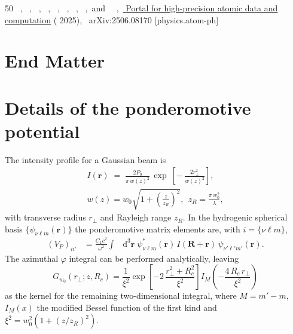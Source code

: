 \documentclass[aps,prl,groupedaddress,superscriptaddress,twocolumn,10pt,longbibliography]{revtex4-2}
\begin{document}
\begin{thebibliography}{50}
  \BibitemOpen
   { {~},  {~},  {~},  {~},  {~},  {~},  {~},  {~},\ and\  {\ },\ }\href {https://arxiv.org/abs/2506.08170} { {Portal for high-precision atomic data and computation}} ( {2025}),\  {arXiv:2506.08170 [physics.atom-ph]} 
\end{thebibliography}










\clearpage
\appendix
\makeatletter
\section{End Matter}
\section{Details of the ponderomotive potential}
\label{app:appendA}
The intensity profile for a Gaussian beam is
\begin{align}
I(\boldsymbol{r}) \;=\; \frac{2P_0}{\pi\,w(z)^2}\,
\exp\ \left[-\,\frac{2r_{\perp}^2}{w(z)^2}\right],
\label{eq:gaussian} \\
w(z)=w_0\sqrt{1+\left(\frac{z}{z_R}\right)^2}, \ \
z_R=\frac{\pi\,w_0^2}{\lambda}, \nonumber
\end{align}
with transverse radius $r_{\perp}$ and Rayleigh range $z_R$. In the hydrogenic spherical basis $\{\psi_{\nu\ell m}(\boldsymbol{r})\}$ the ponderomotive matrix elements are, with $i=\{\nu \ell m\}$,
\begin{align}
(V_P)_{ii'} & =
\frac{C_1 c^2}{\omega^2}
\int & \mathrm{d}^3\boldsymbol{r}\;\psi_{\nu\ell m}^*(\boldsymbol{r})\,I(\boldsymbol{R}+\boldsymbol{r})\,\psi_{\nu'\ell' m'}(\boldsymbol{r}).
\label{eq:Up-matrix}
\end{align}
The azimuthal $\varphi$ integral can be performed analytically, leaving
\begin{equation}
    G_{w_0}(r_{\perp}; z, R_c)=\frac{1}{\xi^2} \exp \left[ -2 \, \frac{r_{\perp}^2+R_c^2}{\xi^2} \right] I_M \left( -\frac{4 \, R_c \, r_{\perp}}{\xi^2}\right)
    \label{eq:bessel}
\end{equation}
as the kernel for the remaining two-dimensional integral, where
 $M=m'-m$, $I_M(x)$ the modified Bessel function of the first kind and $\xi^2=w_0^2(1+(z/z_R)^2)$.
\end{document}
